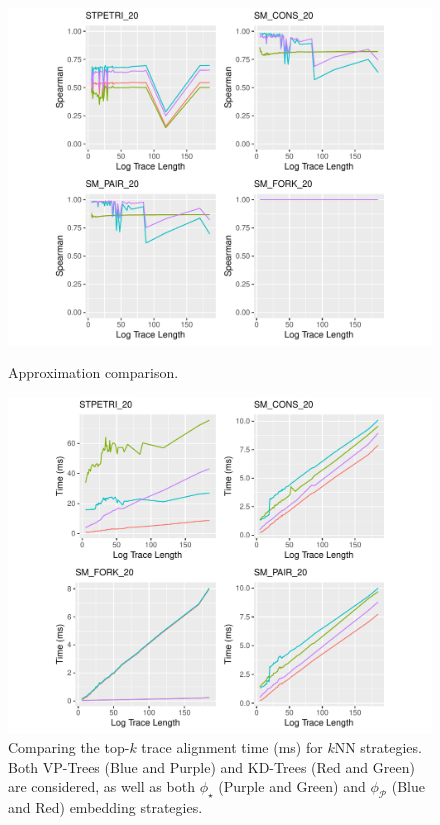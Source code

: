 \begin{figure}[!t]
\begin{minipage}{.49\textwidth}

	\includegraphics[width=1.1\textwidth]{images/Prec.pdf}
	\caption{Approximation comparison.}\label{fig:app}
\end{minipage}\hfill \begin{minipage}{.49\textwidth}

	\includegraphics[width=1.1\textwidth]{images/kronos.pdf}
	\caption{Comparing the top-$k$ trace alignment time (ms) for $k$NN strategies. Both VP-Trees ({\color{ggplotBlue}Blue} and {\color{ggplotPurple}Purple}) and KD-Trees ({\color{ggplotRed}Red} and {\color{ggplotGreen}Green}) are considered, as well as both $\phi_\star$ ({\color{ggplotPurple}Purple} and {\color{ggplotGreen}Green}) and $\phi_{\mathcal{P}}$ ({\color{ggplotBlue}Blue} and {\color{ggplotRed}Red}) embedding strategies.}\label{fig:kronos}
\end{minipage}
\end{figure}
